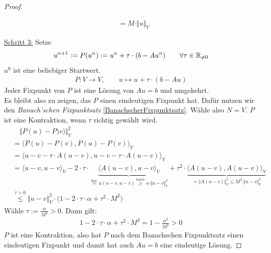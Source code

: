 \begin{proof}
\begin{enumerate}[label=(\alph*)]
\begin{align*}
&=M\cdot\Vert u\Vert_V
\end{align*}
\end{enumerate}
\underline{Schritt 3:} Setze
\begin{align*}
u^{n+1}:=P(u^n):=u^n+\tau\cdot(b-A u^n)\qquad\forall\tau\in\mathbb{R}_{\neq0}
\end{align*}
$u^0$ ist eine beliebiger Startwert.
\begin{align*}
P:V\to V,\qquad u\mapsto u+\tau\cdot(b-Au)
\end{align*}
Jeder Fixpunkt von $P$ ist eine Lösung von $Au=b$ und umgekehrt.\\
Es bleibt also zu zeigen, das $P$ einen eindeutigen Fixpunkt hat. Dafür nutzen wir den \textit{Banach'schen Fixpunktsatz} \ref{BanachscherFixpunktsatz}.\nl
Wähle also $N=V$. $P$ ist eine Kontraktion, wenn $\tau$ richtig gewählt wird.
\begin{align*}
&\quad\Vert P(u)-P)v)\Vert^2_V\\
&=\big\langle P(u)-P(v),P(u)-P(v)\big\rangle_V\\
&=\big\langle u-v-\tau\cdot A(u-v),u-v-\tau\cdot A(u-v)\big\rangle_V\\
&=\langle u-v,u-v\rangle_V-2\cdot\tau\cdot\underbrace{\big\langle A(u-v),u-v\big\rangle_V}_{\stackrel{\text{Def.}}{=}a(u-v,u-v)\stackrel{\text{koerz}}{\geq}\alpha\cdot\Vert u-v\Vert^2_V}+\tau^2\cdot\underbrace{\big\langle A(u-v),A(u-v)\big\rangle_V}_{=\Vert A(u-v)\Vert^2_V\leq M^2\cdot\Vert u-v\Vert^2_V}\\
&\stackrel{\tau>0}{\leq}
\Vert u-v\Vert^2_V\cdot\big(1-2\cdot\tau\cdot\alpha+\tau^2\cdot M^2\big)
\end{align*}
Wähle $\tau:=\frac{\alpha}{M^2}>0$. Dann gilt:
\begin{align*}
1-2\cdot\tau\cdot\alpha+\tau^2\cdot M^2=1-\frac{\alpha^2}{M^2}>0
\end{align*}
$P$ ist eine Kontraktion, also hat $P$ nach dem Banachschen Fixpunktsatz einen eindeutigen Fixpunkt und damit hat auch $Au=b$ eine eindeutige Lösung.
\end{proof}


